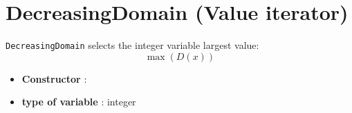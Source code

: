 \section{DecreasingDomain (Value iterator)}\label{decreasingdomain:decreasingdomainvaliterator}\hypertarget{decreasingdomain:decreasingdomainvaliterator}{}
\begin{notedef}
  \texttt{DecreasingDomain} selects the integer variable largest value:
$$\max(D(x))$$
\end{notedef}

\begin{itemize}
	\item \textbf{Constructor} : 
	\item \textbf{type of variable} : integer
\end{itemize}

%

